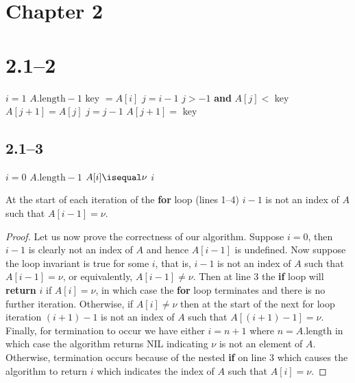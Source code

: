 \section{Chapter 2}
\label{sec:chp2}

\section*{2.1--2}

\begin{codebox}
	\li \For $i = 1$ \To $A.\text{length}-1$
	\li	\Do
				key $= A[i]$
	\li 	$j = i - 1$
	\li		\While $j > -1$ \textbf{and} $A[j] <$ key
	\li		\Do
					$A[j+1] = A[j]$
	\li			$j = j - 1$
				\End
	\li		$A[j+1] =$ key
			\End
\end{codebox}

\subsection*{2.1--3}

\begin{codebox}
	\li \For $i = 0$ \To $A.\text{length}-1$
	\li \Do
				\If $A[i] \isequal \nu$
	\li		\Then
					\Return $i$
				\End
			\End
	\li		\Return {}
\end{codebox}

\begin{invariant}
	At the start of each iteration of the \textbf{for} loop (lines 1--4) $i-1$ is not an index of $A$ such that $A[i-1]=\nu$.
\end{invariant}

\begin{proof}
	Let us now prove the correctness of our algorithm. Suppose $i=0$, then $i-1$ is clearly not an index of $A$ and hence $A[i-1]$ is undefined. Now suppose the loop invariant is true for some $i$, that is, $i-1$ is not an index of $A$ such that $A[i-1]=\nu$, or equivalently, $A[i-1]\neq\nu$. Then at line 3 the \textbf{if} loop will \textbf{return} $i$ if $A[i]=\nu$, in which case the \textbf{for} loop terminates and there is no further iteration. Otherwise, if $A[i]\neq\nu$ then at the start of the next for loop iteration $(i+1)-1$ is not an index of $A$ such that $A[(i+1)-1]=\nu$. Finally, for termination to occur we have either $i=n+1$ where $n=A.\text{length}$ in which case the algorithm returns NIL indicating $\nu$ is not an element of $A$. Otherwise, termination occurs because of the nested \textbf{if} on line 3 which causes the algorithm to return $i$ which indicates the index of $A$ such that $A[i]=\nu$.
\end{proof}

